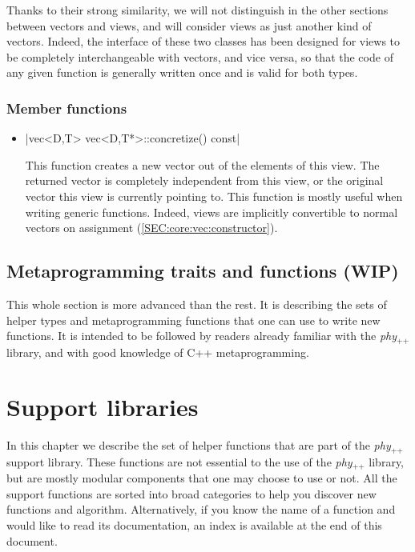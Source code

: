\documentclass[12pt]{report}
\newcommand{\phypp}{\textit{phy}$_{\text{++}}$\xspace}
\newenvironment{warning}
{
    \begin{mdframed}[style=warning,frametitle={Warning}]
}
{
    \end{mdframed}
}
\begin{document}
Thanks to their strong similarity, we will not distinguish in the other sections between vectors and views, and will consider views as just another kind of vectors. Indeed, the interface of these two classes has been designed for views to be completely interchangeable with vectors, and vice versa, so that the code of any given function is generally written once and is valid for both types.

\subsection{Member functions \label{SEC:core:view:member_fun}}

\begin{itemize}
\item \cppinline|vec<D,T> vec<D,T*>::concretize() const|

This function creates a new vector out of the elements of this view. The returned vector is completely independent from this view, or the original vector this view is currently pointing to. This function is mostly useful when writing generic functions. Indeed, views are implicitly convertible to normal vectors on assignment (\ref{SEC:core:vec:constructor}).
\end{itemize}

\section{Metaprogramming traits and functions (WIP) \label{SEC:core:meta}}

\begin{warning}
This whole section is more advanced than the rest. It is describing the sets of helper types and metaprogramming functions that one can use to write new functions. It is intended to be followed by readers already familiar with the \phypp library, and with good knowledge of C++ metaprogramming.
\end{warning}






\chapter{Support libraries \label{SEC:support}}

In this chapter we describe the set of helper functions that are part of the \phypp support library. These functions are not essential to the use of the \phypp library, but are mostly modular components that one may choose to use or not. All the support functions are sorted into broad categories to help you discover new functions and algorithm. Alternatively, if you know the name of a function and would like to read its documentation, an index is available at the end of this document.
\end{document}
